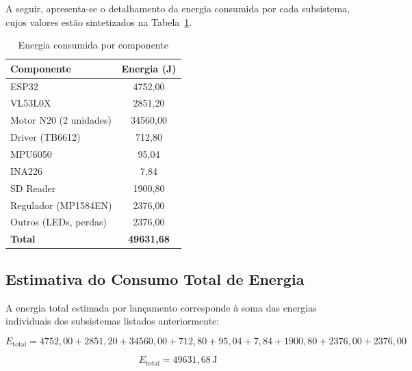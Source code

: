 A seguir, apresenta-se o detalhamento da energia consumida por cada subsistema, cujos valores estão sintetizados na Tabela~\ref{tab:energia_por_componente}.

\begin{table}[htbp]
    \centering
    \caption{Energia consumida por componente}
    \label{tab:energia_por_componente}

    \renewcommand{\arraystretch}{1.2}

    \begin{tabular}{lc}
        \hline
        \textbf{Componente} & \textbf{Energia (J)} \\
        \hline

        ESP32 & 4752,00 \\
        VL53L0X & 2851,20 \\
        Motor N20 (2 unidades) & 34560,00 \\
        Driver (TB6612) & 712,80 \\
        MPU6050 & 95,04 \\
        INA226 & 7,84 \\
        SD Reader & 1900,80 \\
        Regulador (MP1584EN) & 2376,00 \\
        Outros (LEDs, perdas) & 2376,00 \\

        \hline
        \textbf{Total} & \textbf{49631,68} \\
        \hline
    \end{tabular}
\end{table}

\subsection{Estimativa do Consumo Total de Energia}
\label{sec:consumo_total_energia}

A energia total estimada por lançamento corresponde à soma das energias individuais dos subsistemas listados anteriormente:

\begin{equation}
E_{\text{total}}
=
4752{,}00 + 2851{,}20 + 34560{,}00 + 712{,}80 + 95{,}04 + 7{,}84 + 1900{,}80 + 2376{,}00 + 2376{,}00
\end{equation}

\begin{equation}
E_{\text{total}}
=
49631{,}68\,\mathrm{J}
\end{equation}

